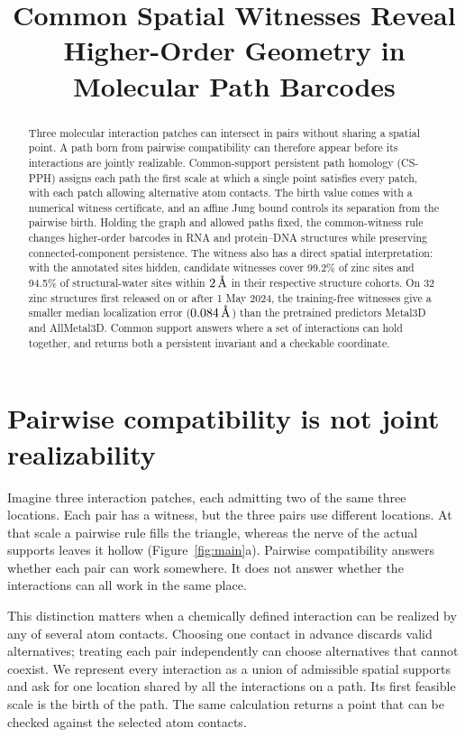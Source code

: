 \documentclass[11pt]{article}
\title{Common Spatial Witnesses Reveal Higher-Order Geometry in Molecular Path Barcodes}
\author{}
\date{}
\newcommand{\angstrom}{\ensuremath{\text{\normalfont\AA}}}
\begin{document}
\maketitle

\begin{abstract}
Three molecular interaction patches can intersect in pairs without sharing a spatial point. A path born from pairwise compatibility can therefore appear before its interactions are jointly realizable. Common-support persistent path homology (CS-PPH) assigns each path the first scale at which a single point satisfies every patch, with each patch allowing alternative atom contacts. The birth value comes with a numerical witness certificate, and an affine Jung bound controls its separation from the pairwise birth. Holding the graph and allowed paths fixed, the common-witness rule changes higher-order barcodes in RNA and protein--DNA structures while preserving connected-component persistence. The witness also has a direct spatial interpretation: with the annotated sites hidden, candidate witnesses cover 99.2\% of zinc sites and 94.5\% of structural-water sites within $2\,\angstrom$ in their respective structure cohorts. On 32 zinc structures first released on or after 1 May 2024, the training-free witnesses give a smaller median localization error ($0.084\,\angstrom$) than the pretrained predictors Metal3D and AllMetal3D. Common support answers where a set of interactions can hold together, and returns both a persistent invariant and a checkable coordinate.
\end{abstract}

\section{Pairwise compatibility is not joint realizability}

Imagine three interaction patches, each admitting two of the same three locations. Each pair has a witness, but the three pairs use different locations. At that scale a pairwise rule fills the triangle, whereas the nerve of the actual supports leaves it hollow (Figure~\ref{fig:main}a). Pairwise compatibility answers whether each pair can work somewhere. It does not answer whether the interactions can all work in the same place.

This distinction matters when a chemically defined interaction can be realized by any of several atom contacts. Choosing one contact in advance discards valid alternatives; treating each pair independently can choose alternatives that cannot coexist. We represent every interaction as a union of admissible spatial supports and ask for one location shared by all the interactions on a path. Its first feasible scale is the birth of the path. The same calculation returns a point that can be checked against the selected atom contacts.
\end{document}
